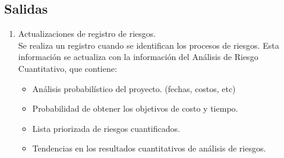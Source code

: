 \subsection{Salidas}
\begin{enumerate}
	\item Actualizaciones de registro de riesgos.\\
        Se realiza un registro cuando se identifican los procesos de riesgos.
        Esta información se actualiza con la información del Análisis de Riesgo Cuantitativo, que contiene:
		\begin{itemize}
			\item Análisis probabilístico del proyecto. (fechas, costos, etc)
			\item Probabilidad de obtener los objetivos de costo y tiempo.
			\item Lista priorizada de riesgos cuantificados.
			\item Tendencias en los resultados cuantitativos de análisis de riesgos.
		\end{itemize}
\end{enumerate}                                                                                                              
